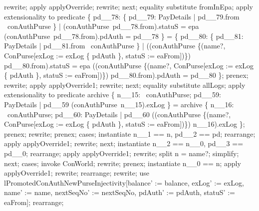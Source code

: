 \begin{LPScript}
\begin{zproof}[lPromotedAuxWorldAbortType]
            rewrite;
            apply applyOverride;
            rewrite;
        next;
            equality substitute fromInEpa;
            apply extensionality to predicate
                \{ pd\_\_78: \{ pd\_\_79: PayDetails | pd\_\_79.from \in \dom~conAuthPurse \}
                    | (conAuthPurse~pd\_\_78.from).statuS = epa
                    \land (conAuthPurse~pd\_\_78.from).pdAuth = pd\_\_78 \}
                = \{ pd\_\_80: \{ pd\_\_81: PayDetails | pd\_\_81.from \in \dom~conAuthPurse \}
                    | ((conAuthPurse \oplus \{(name?, \theta ConPurse[exLog := exLog \cup \{ pdAuth \},
                        statuS := eaFrom])\}) pd\_\_80.from).statuS = epa
                    \land ((conAuthPurse \oplus \{(name?, \theta ConPurse[exLog := exLog \cup \{ pdAuth \},
                        statuS := eaFrom])\}) pd\_\_80.from).pdAuth = pd\_\_80 \};
            prenex;
            rewrite;
            apply applyOverride1;
            rewrite;
        next;
            equality substitute allLogs;
            apply extensionality to predicate
                archive \cup \{ n\_\_15: \dom~conAuthPurse; pd\_\_59: PayDetails |
                    pd\_\_59 \in (conAuthPurse~n\_\_15).exLog \} =
                archive \cup \{ n\_\_16: \dom~conAuthPurse; pd\_\_60: PayDetails |
                    pd\_\_60 \in ((conAuthPurse \oplus \{(name?,
                        \theta ConPurse[exLog := exLog \cup \{ pdAuth \},
                            statuS := eaFrom])\}) n\_\_16).exLog \};
            prenex;
            rewrite;
            prenex;
            cases;
                instantiate n\_\_1 == n, pd\_\_2 == pd;
                rearrange;
                apply applyOverride1;
                rewrite;
            next;
                instantiate n\_\_2 == n\_\_0, pd\_\_3 == pd\_\_0;
                rearrange;
                apply applyOverride1;
                rewrite;
                split \lnot n = name?;
                simplify;
    next;
        cases;
            invoke ConWorld;
            rewrite;
            prenex;
            instantiate n\_\_0 == n;
            apply applyOverride1;
            rewrite;
            rearrange;
            rewrite;
            use lPromotedConAuthNewPurseInjectivity[balance' := balance,
                exLog' := exLog, name' := name, nextSeqNo' := nextSeqNo,
                pdAuth' := pdAuth, statuS' := eaFrom];
            rearrange;

\end{zproof}
\end{LPScript}
